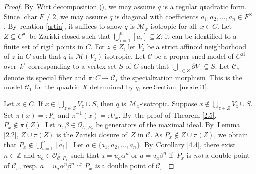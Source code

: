 \documentclass[JEP,XML,SOM,Unicode,NoFloatCountersInSection,published]{cedram}
\newcommand{\al}{\mathrm{al}}
\DeclareMathOperator{\Char}{char}
\theoremstyle{definition}
\begin{document}
\begin{proof}
By~Witt decomposition (\cite[I.4.1]{lam}), we may assume $q$ is a regular quadratic form. Since $\Char F \neq 2$, we may assume $q$ is diagonal with coefficients ${a_1, a_2, \dots, a_n\in F^{\times}}$. By~relation \eqref{artin}, it suffices to show $q$ is $\mathscr{M}_x$-isotropic for all~$x \in C$. Let $Z \subseteq C^{\al}$ be Zariski closed such that $\bigcup_{i=1}^n [a_i] \subseteq Z$; it can be identified to a finite set of rigid points in $C$. For $z \in Z$, let $V_z$ be a strict affinoid
neighborhood of $z$ in $C$ such that $q$ is $\mathscr{M}(V_z)$-isotropic. Let $\mathscr{C}$ be a proper sncd model of $C^{\al}$ over~$k^{\circ}$ corresponding to a vertex set $S$ of
$C$ such that $\bigcup_{z \in Z} \partial{V_z} \subseteq S$. Let $\mathscr{C}_s$ denote its special fiber and $\pi: C \to
\mathscr{C}_s$ the specialization morphism. This is the model $\mathscr{C}_1$ for the quadric $X$ determined by $q$; see Section~\ref{modeli1}.

Let $x \in C$. If $x \in \bigcup_{z \in Z}V_z \cup S$, then $q$ is $\mathscr{M}_x$-isotropic. Suppose ${x \not \in {\bigcup_{z \in Z} V_z \cup S}}$. Set $\pi(x)=:P_x$ and ${\pi^{-1}(x)=:U_x}$. By~the proof of Theorem \ref{2.5}, $P_x \not \in \pi(Z)$.
Let $\alpha, \beta \in \mathcal{O}_{\mathscr{C}, P_x}$ be generators of the maximal ideal. By~Lemma \ref{2.2}, $Z \cup \pi(Z)$ is the Zariski closure of~$Z$ in $\mathscr{C}$. As $P_x \not \in Z \cup \pi(Z)$, we obtain that $P_x \not \in \bigcup_{i=1}^n \overline{[a_i]}$. Let $a \in \{a_1, a_2, \dots, a_n\}$. By~Corollary \ref{4.4}, there exist $n \in \mathbb{Z}$ and $u_a \in \mathcal{O}_{\mathscr{C}, P_x}^{\times}$ such that $a=u_a \alpha^n$ or $a=u_a\beta^n$ if~$P_x$ is \emph{not} a double point of $\mathscr{C}_s$, resp. $a=u_a \alpha^n \beta^n$ if~$P_x$ \emph{is} a double point of $\mathscr{C}_s$.


\end{proof}
\end{document}
